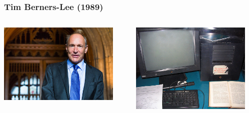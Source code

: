 \documentclass[14pt]{beamer}
\begin{document}
\begin{frame}
	\frametitle{Tim Berners-Lee (1989)}
	\begin{center}
		\begin{columns}
			\begin{column}{0.5\textwidth}
		\includegraphics[width=0.9\textwidth]{tim_berners_lee.jpg}
			\end{column}
			\begin{column}{0.5\textwidth}
		\includegraphics[width=0.9\textwidth]{tim_berners_lee_setup.jpg}
			\end{column}
		\end{columns}
		\vspace*{1em}
	\end{center}
\end{frame}
\end{document}

